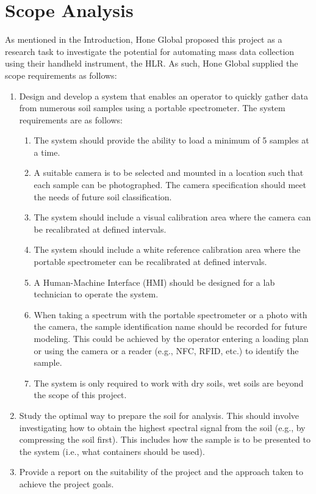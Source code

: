 \documentclass{UoNMCHA}
\numberwithin{equation}{section}
\begin{document}
\section{Scope Analysis}\label{sec:Scope_Analysis}
As mentioned in the Introduction, Hone Global proposed this project as a research task to investigate the potential for automating mass data collection using their handheld instrument, the HLR. As such, Hone Global supplied the scope requirements as follows:\\
\begin{enumerate}
	\item Design and develop a system that enables an operator to quickly gather data from numerous soil samples using a portable spectrometer. The system requirements are as follows:
	\begin{enumerate}
		\item The system should provide the ability to load a minimum of 5 samples at a time.
		\item A suitable camera is to be selected and mounted in a location such that each sample can be photographed. The camera specification should meet the needs of future soil classification.
		\item The system should include a visual calibration area where the camera can be recalibrated at defined intervals.
		\item The system should include a white reference calibration area where the portable spectrometer can be recalibrated at defined intervals.
		\item A Human-Machine Interface (HMI) should be designed for a lab technician to operate the system.
		\item When taking a spectrum with the portable spectrometer or a photo with the camera, the sample identification name should be recorded for future modeling. This could be achieved by the operator entering a loading plan or using the camera or a reader (e.g., NFC, RFID, etc.) to identify the sample.
		\item The system is only required to work with dry soils, wet soils are beyond the scope of this project.
	\end{enumerate}
	\item Study the optimal way to prepare the soil for analysis. This should involve investigating how to obtain the highest spectral signal from the soil (e.g., by compressing the soil first). This includes how the sample is to be presented to the system (i.e., what containers should be used).\\
	\item Provide a report on the suitability of the project and the approach taken to achieve the project goals.
\end{enumerate}
\end{document}
